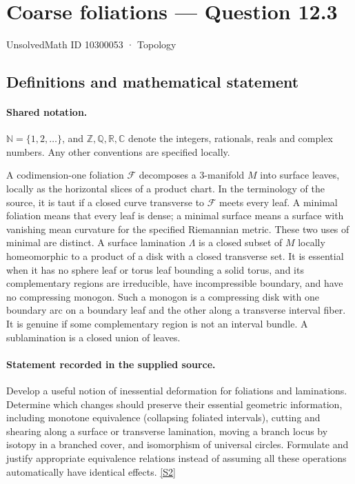 \documentclass[11pt]{article}
\newcommand{\sref}[2]{\hyperlink{source:#1:#2}{[S#2]}}
\begin{document}
\setcounter{section}{10300052}
\section{Coarse foliations — Question 12.3}\label{10300053}
{\small\sffamily UnsolvedMath ID 10300053 · Topology}
\subsection{Definitions and mathematical statement}

\paragraph{Shared notation.}$\mathbb N=\{1,2,\ldots\}$, and $\mathbb Z,\mathbb Q,\mathbb R,\mathbb C$ denote the integers, rationals, reals and complex numbers. Any other conventions are specified locally.


A codimension-one foliation $\mathcal F$ decomposes a $3$-manifold $M$ into surface leaves, locally as the horizontal slices of a product chart. In the terminology of the source, it is taut if a closed curve transverse to $\mathcal F$ meets every leaf. A minimal foliation means that every leaf is dense; a minimal surface means a surface with vanishing mean curvature for the specified Riemannian metric. These two uses of minimal are distinct. A surface lamination $\Lambda$ is a closed subset of $M$ locally homeomorphic to a product of a disk with a closed transverse set. It is essential when it has no sphere leaf or torus leaf bounding a solid torus, and its complementary regions are irreducible, have incompressible boundary, and have no compressing monogon. Such a monogon is a compressing disk with one boundary arc on a boundary leaf and the other along a transverse interval fiber. It is genuine if some complementary region is not an interval bundle. A sublamination is a closed union of leaves.
\paragraph{Statement recorded in the supplied source.}
Develop a useful notion of inessential deformation for foliations and laminations. Determine which changes should preserve their essential geometric information, including monotone equivalence (collapsing foliated intervals), cutting and shearing along a surface or transverse lamination, moving a branch locus by isotopy in a branched cover, and isomorphism of universal circles. Formulate and justify appropriate equivalence relations instead of assuming all these operations automatically have identical effects. \sref{10300053}{2}
\end{document}
